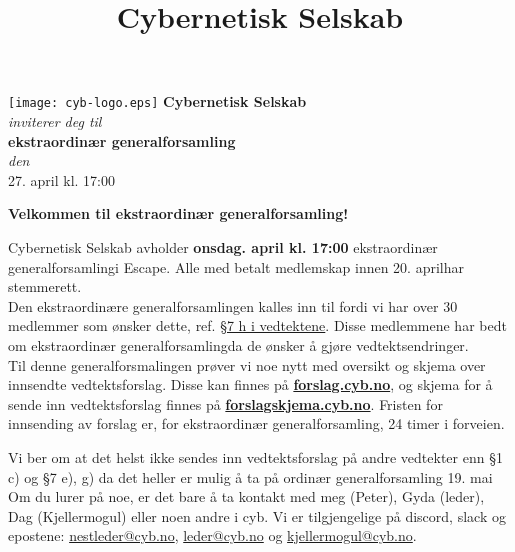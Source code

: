 \documentclass[12pt, norsk, a4paper]{proc}
\title{Cybernetisk Selskab}
\newcommand{\genforsDato}{27. april  kl. 17:00} %
\newcommand{\genforsDag}{onsdag} %
\newcommand{\genforsDatoUkeFoer}{20. april} %
\newcommand{\generalforsamling}{ekstraordinær generalforsamling} %
\begin{document}
   \begin{strip}
   \begin{center}
   \texttt{[image: cyb-logo.eps]} 
    \Large\textbf{Cybernetisk Selskab}\\
    \textit{inviterer deg til}\\
    \large\textbf{\generalforsamling} \\
    \emph{den} \\
    \large \genforsDato \\
   \end{center}
   \end{strip}

\textbf{Velkommen til \generalforsamling!}

Cybernetisk Selskab avholder \textbf{\genforsDag \space \genforsDato} \generalforsamling \space i Escape. Alle med betalt medlemskap innen \genforsDatoUkeFoer \space har stemmerett.\\

Den ekstraordinære generalforsamlingen kalles inn til fordi vi har over 30 medlemmer som ønsker dette, ref. \href{http://vedtekter.cyb.no/}{§7 h i vedtektene}. Disse medlemmene har bedt om \generalforsamling \space da de ønsker å gjøre vedtektsendringer.\\

Til denne generalforsmalingen prøver vi noe nytt med oversikt og skjema over innsendte vedtektsforslag. Disse kan finnes på  \textbf{\href{http://forslag.cyb.no/}{forslag.cyb.no}}, og skjema for å sende inn vedtektsforslag finnes på \textbf{\href{http://forslagskjema.cyb.no/}{forslagskjema.cyb.no}}. Fristen for innsending av forslag er,  for \generalforsamling, 24 timer i forveien.

Vi ber om at det helst ikke sendes inn vedtektsforslag på andre vedtekter enn §1 c) og §7 e), g) da det heller er mulig å ta på ordinær generalforsamling 19. mai\\


Om du lurer på noe, er det bare å ta kontakt med 
meg (Peter), 
Gyda (leder),
Dag (Kjellermogul) 
eller noen andre i cyb. Vi er tilgjengelige på
discord, slack og epostene: \href{mailto:nestleder@cyb.no}{nestleder@cyb.no}, \href{mailto:leder@cyb.no}{leder@cyb.no} og
\href{mailto:kjellermogul@cyb.no}{kjellermogul@cyb.no}.\\
\end{document}
